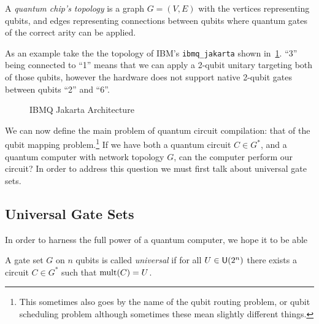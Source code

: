 \begin{definition}
    A \emph{quantum chip's topology} is a graph $G = (V, E)$ with the vertices representing qubits, and edges representing connections between qubits where quantum gates of the correct arity can be applied.
\end{definition}

As an example take the the topology of IBM's \texttt{ibmq\_jakarta} shown in~\ref{fig:ibm-jakarta}.
``3'' being connected to ``1'' means that we can apply a 2-qubit unitary targeting both of those qubits, however the hardware does not support native 2-qubit gates between qubits ``2'' and ``6''.
\begin{figure}[ht]
    \centering
    \caption{IBMQ Jakarta Architecture}\label{fig:ibm-jakarta}
\end{figure}

We can now define the main problem of quantum circuit compilation: that of the qubit mapping problem.\footnote{This sometimes also goes by the name of the qubit routing problem, or qubit scheduling problem although sometimes these mean slightly different things.}
If we have both a quantum circuit $C\in G^*$, and a quantum computer with network topology $G$, can the computer perform our circuit?
In order to address this question we must first talk about universal gate sets.
\subsection{Universal Gate Sets}
In order to harness the full power of a quantum computer, we hope it to be able
\begin{definition}
    A gate set $G$ on $n$ qubits is called \emph{universal} if for all $U\in\mathsf{U} (2^n)$ there exists a circuit $C\in G^*$ such that $\operatorname{mult}(C) = U$.
\end{definition}

